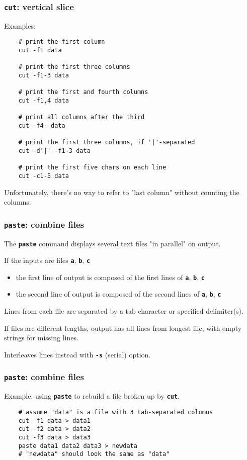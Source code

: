 \begin{frame}
\frametitle{\textbf{\tt{cut}}: vertical slice}
Examples:
\begin{verbatim}
    # print the first column
    cut -f1 data 
    
    # print the first three columns
    cut -f1-3 data
    
    # print the first and fourth columns
    cut -f1,4 data
    
    # print all columns after the third
    cut -f4- data
    
    # print the first three columns, if '|'-separated
    cut -d'|' -f1-3 data
    
    # print the first five chars on each line
    cut -c1-5 data
\end{verbatim}

{\small Unfortunately, there's no way to refer to "last column" without counting the columns.}
\end{frame}

\begin{frame}
\frametitle{\textbf{\tt{paste}}: combine files}
The \textbf{\tt{paste}} command displays several text files "in parallel" on output.

If the inputs are files \textbf{\tt{a}}, \textbf{\tt{b}}, \textbf{\tt{c}}
\begin{itemize}
\item  the first line of output is composed of the first lines of \textbf{\tt{a}}, \textbf{\tt{b}}, \textbf{\tt{c}}
\item  the second line of output is composed of the second lines of \textbf{\tt{a}}, \textbf{\tt{b}}, \textbf{\tt{c}}
\end{itemize}
Lines from each file are separated by a tab character or specified delimiter(s).

If files are different lengths, output has all lines from longest file,
with empty strings for missing lines.

Interleaves lines instead with \textbf{\tt{-s}} (serial) option.
\end{frame}

\begin{frame}[fragile]
\frametitle{\textbf{\tt{paste}}: combine files}
Example: using \textbf{\tt{paste}} to rebuild a file broken up by \textbf{\tt{cut}}.

\begin{verbatim}
    # assume "data" is a file with 3 tab-separated columns
    cut -f1 data > data1
    cut -f2 data > data2
    cut -f3 data > data3
    paste data1 data2 data3 > newdata
    # "newdata" should look the same as "data"
\end{verbatim}

\end{frame}

